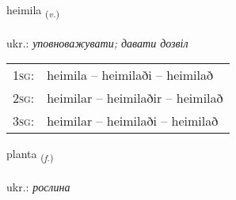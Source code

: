 \documentclass[frontgrid, backgrid]{flacards}\usepackage[]{graphicx}\usepackage[]{xcolor}
\begin{document}
\renewcommand{\flhead}{\vskip5pt \fboxsep=0pt {\small\bfseries\footnotesize Sagnorð | дієслово}}
\renewcommand{\fcfoot}{\vskip5pt \fboxsep=0pt \hspace{2pt}{\small\bfseries\footnotesize 3K}}

\renewcommand{\blhead}{\vskip5pt {\small\bfseries\footnotesize Sagnorð | дієслово }}
\renewcommand{\bcfoot}{\vskip5pt \hspace{2pt}{\small\bfseries\footnotesize 3K}}


{heimila \small{\textsubscript{(\textit{v.})}} \\[1ex] %
\textphonetic{[heiːmɪla]} \\
ukr.: \emph{уповноважувати; давати дозвіл} \\  [2ex]
\renewcommand*{\arraystretch}{0.8}
\begin{tabular}{p{1cm}l}
\textsc{1sg}: & heimila -- heimilaði -- heimilað \\ 
\textsc{2sg}: & heimilar -- heimilaðir -- heimilað \\ 
\textsc{3sg}: & heimilar -- heimilaði -- heimilað \\ 
\end{tabular}
}

\renewcommand{\flhead}{\vskip5pt \fboxsep=0pt {\small\bfseries\footnotesize Nafnorð | іменник}}
\renewcommand{\fcfoot}{\vskip5pt \fboxsep=0pt \hspace{2pt}{\small\bfseries\footnotesize 3K}}

\renewcommand{\blhead}{\vskip5pt {\small\bfseries\footnotesize Nafnorð | іменник }}
\renewcommand{\bcfoot}{\vskip5pt \hspace{2pt}{\small\bfseries\footnotesize 3K}}


{planta \small{\textsubscript{(\textit{f.})}} \\[1ex] %
\textphonetic{[pʰlan̥ta]} \\
ukr.: \emph{рослина} \\  [2ex]
\renewcommand*{\arraystretch}{0.8}
}
\end{document}
